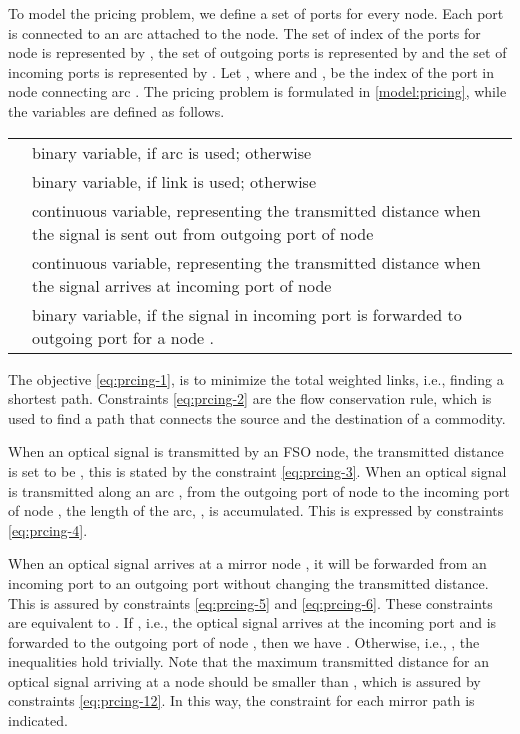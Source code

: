 \documentclass[onecolumn,11pt,draftclsnofoot]{IEEEtran}
\begin{document}
To model the pricing problem, we define a set of ports for every node. Each port is connected to an arc attached to the node. The set of index of the ports for node  is represented by , the set of outgoing ports is represented by  and the set of incoming ports is represented by . Let , where  and , be the index of the port in node  connecting arc . The pricing problem is formulated in \eqref{model:pricing}, while the variables are defined as follows.

\begin{tabular}{lp{16cm}}
 & binary variable,  if arc  is used;  otherwise\\
 & binary variable,  if link  is used;  otherwise\\
 & continuous variable, representing the transmitted distance when the signal is sent out from outgoing port  of node \\
 & continuous variable, representing the transmitted distance when the signal arrives at incoming port  of node \\
 & binary variable,  if the signal in incoming port  is forwarded to outgoing port  for a node .\\
\end{tabular}

The objective \eqref{eq:prcing-1}, is to minimize the total weighted links, i.e., finding a shortest path. Constraints \eqref{eq:prcing-2} are the flow conservation rule, which is used to find a path that connects the source  and the destination  of a commodity.

When an optical signal is transmitted by an FSO node, the transmitted distance is set to be , this is stated by the constraint \eqref{eq:prcing-3}.
When an optical signal is transmitted along an arc , from the outgoing port  of node  to the incoming port  of node , the length of the arc, , is accumulated. This is expressed by constraints \eqref{eq:prcing-4}.

When an optical signal arrives at a mirror node , it will be forwarded from an incoming port to an outgoing port without changing the transmitted distance. This is assured by constraints \eqref{eq:prcing-5} and \eqref{eq:prcing-6}. These constraints are equivalent to . If , i.e., the optical signal arrives at the incoming port   and is forwarded to the outgoing port  of node , then we have . Otherwise, i.e., , the inequalities hold trivially.
Note that the maximum transmitted distance for an optical signal arriving at a node should be smaller than , which is assured by constraints \eqref{eq:prcing-12}. In this way, the constraint for each mirror path is indicated.
\end{document}
